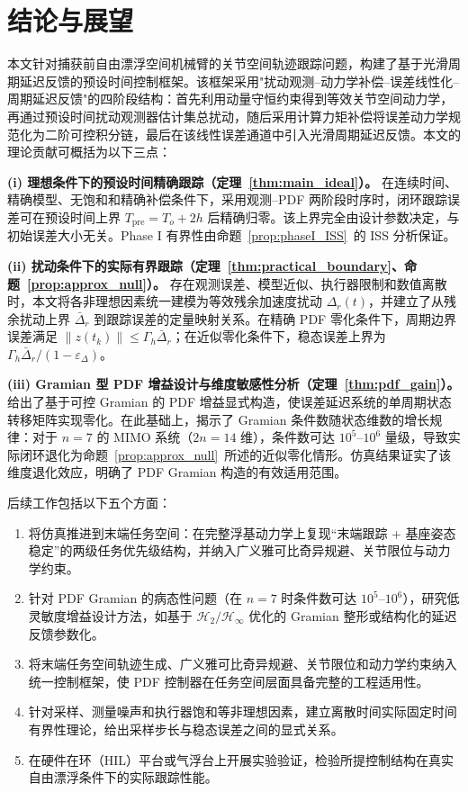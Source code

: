 \section{结论与展望}
\label{sec:conclusion}

本文针对捕获前自由漂浮空间机械臂的关节空间轨迹跟踪问题，构建了基于光滑周期延迟反馈的预设时间控制框架。该框架采用"扰动观测--动力学补偿--误差线性化--周期延迟反馈"的四阶段结构：首先利用动量守恒约束得到等效关节空间动力学，再通过预设时间扰动观测器估计集总扰动，随后采用计算力矩补偿将误差动力学规范化为二阶可控积分链，最后在该线性误差通道中引入光滑周期延迟反馈。本文的理论贡献可概括为以下三点：

\noindent\textbf{(i) 理想条件下的预设时间精确跟踪（定理~\ref{thm:main_ideal}）。} 在连续时间、精确模型、无饱和和精确补偿条件下，采用观测--PDF 两阶段时序时，闭环跟踪误差可在预设时间上界 \(T_{\mathrm{pre}}=T_o+2h\) 后精确归零。该上界完全由设计参数决定，与初始误差大小无关。Phase I 有界性由命题~\ref{prop:phaseI_ISS}~的 ISS 分析保证。

\noindent\textbf{(ii) 扰动条件下的实际有界跟踪（定理~\ref{thm:practical_boundary}、命题~\ref{prop:approx_null}）。} 存在观测误差、模型近似、执行器限制和数值离散时，本文将各非理想因素统一建模为等效残余加速度扰动 \(\Delta_r(t)\)，并建立了从残余扰动上界 \(\bar\Delta_r\) 到跟踪误差的定量映射关系。在精确 PDF 零化条件下，周期边界误差满足 \(\|z(t_k)\|\le \Gamma_h\bar\Delta_r\)；在近似零化条件下，稳态误差上界为 \(\Gamma_h\bar\Delta_r/(1-\varepsilon_\Delta)\)。

\noindent\textbf{(iii) Gramian 型 PDF 增益设计与维度敏感性分析（定理~\ref{thm:pdf_gain}）。} 给出了基于可控 Gramian 的 PDF 增益显式构造，使误差延迟系统的单周期状态转移矩阵实现零化。在此基础上，揭示了 Gramian 条件数随状态维数的增长规律：对于 \(n=7\) 的 MIMO 系统（\(2n=14\) 维），条件数可达 \(10^5\)--\(10^6\) 量级，导致实际闭环退化为命题~\ref{prop:approx_null}~所述的近似零化情形。仿真结果证实了该维度退化效应，明确了 PDF Gramian 构造的有效适用范围。

后续工作包括以下五个方面：
\begin{enumerate}
  \item 将仿真推进到末端任务空间：在完整浮基动力学上复现“末端跟踪 + 基座姿态稳定”的两级任务优先级结构，并纳入广义雅可比奇异规避、关节限位与动力学约束。
  \item 针对 PDF Gramian 的病态性问题（在 \(n=7\) 时条件数可达 \(10^5\!\)--\(10^6\)），研究低灵敏度增益设计方法，如基于 \(\mathcal H_2/\mathcal H_\infty\) 优化的 Gramian 整形或结构化的延迟反馈参数化。
  \item 将末端任务空间轨迹生成、广义雅可比奇异规避、关节限位和动力学约束纳入统一控制框架，使 PDF 控制器在任务空间层面具备完整的工程适用性。
  \item 针对采样、测量噪声和执行器饱和等非理想因素，建立离散时间实际固定时间有界性理论，给出采样步长与稳态误差之间的显式关系。
  \item 在硬件在环（HIL）平台或气浮台上开展实验验证，检验所提控制结构在真实自由漂浮条件下的实际跟踪性能。
\end{enumerate}
